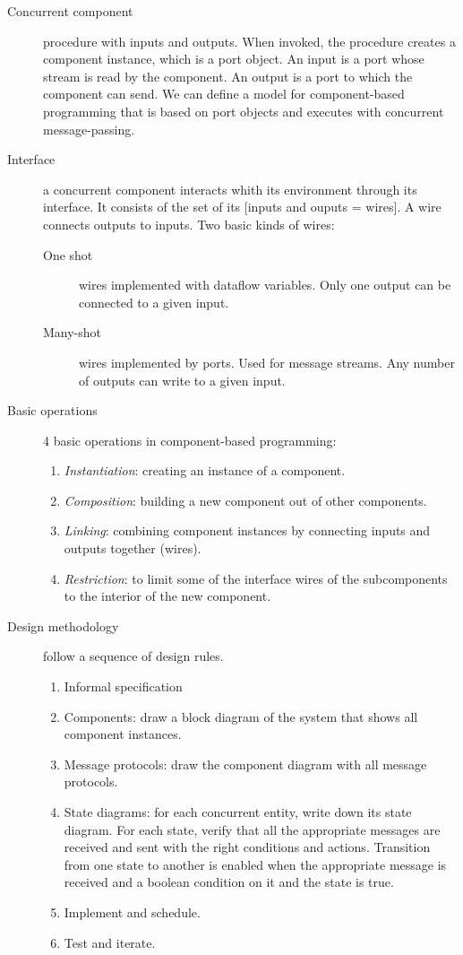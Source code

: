 \begin{description}
  \item[Concurrent component] procedure with inputs and outputs.
    When invoked, the procedure creates a component instance, which is a port object.
    An input is a port whose stream is read by the component.
    An output is a port to which the component can send.
    We can define a model for component-based programming that is based on port objects and executes with concurrent message-passing.

  \item[Interface] a concurrent component interacts whith its environment through its interface.
    It consists of the set of its [inputs and ouputs = wires].
    A wire connects outputs to inputs.
    Two basic kinds of wires:
    \begin{description}
      \item[One shot] wires implemented with dataflow variables.
        Only one output can be connected to a given input.
      \item[Many-shot] wires implemented by ports.
        Used for message streams.
        Any number of outputs can write to a given input.
    \end{description}

  \item[Basic operations] 4 basic operations in component-based programming:
    \begin{enumerate}
      \item \emph{Instantiation}: creating an instance of a component.
      \item \emph{Composition}: building a new component out of other components.
      \item \emph{Linking}: combining component instances by connecting inputs and outputs together (wires).
      \item \emph{Restriction}: to limit some of the interface wires of the subcomponents to the interior of the new component.
    \end{enumerate}

  \item[Design methodology] follow a sequence of design rules.
    \begin{enumerate}
      \item Informal specification
      \item Components: draw a block diagram of the system that shows all component instances.
      \item Message protocols: draw the component diagram with all message protocols.
      \item State diagrams: for each concurrent entity, write down its state diagram.
        For each state, verify that all the appropriate messages are received and sent with the right conditions and actions.
        Transition from one state to another is enabled when the appropriate message is received and a boolean condition on it and the state is true.
      \item Implement and schedule.
      \item Test and iterate.
    \end{enumerate}
\end{description}

